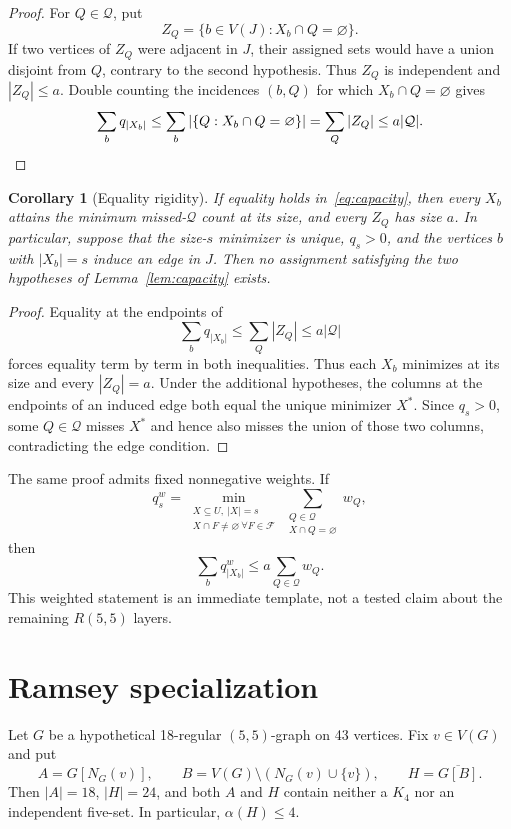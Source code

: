 \documentclass[11pt]{article}
\newtheorem{corollary}[theorem]{Corollary}
\newcommand{\Q}{\mathcal Q}
\newcommand{\F}{\mathcal F}
\begin{document}
\begin{proof}
For $Q\in\Q$, put
\[
 Z_Q=\{b\in V(J):X_b\cap Q=\varnothing\}.
\]
If two vertices of $Z_Q$ were adjacent in $J$, their assigned sets would have
a union disjoint from $Q$, contrary to the second hypothesis.  Thus $Z_Q$ is
independent and $|Z_Q|\leq a$.  Double counting the incidences $(b,Q)$ for
which $X_b\cap Q=\varnothing$ gives
\[
 \sum_bq_{|X_b|}
 \leq\sum_b|\{Q:X_b\cap Q=\varnothing\}|
 =\sum_Q|Z_Q|
 \leq a|\Q|.\qedhere
\]
\end{proof}

\begin{corollary}[Equality rigidity]\label{cor:rigidity}
If equality holds in~\eqref{eq:capacity}, then every $X_b$ attains the
minimum missed-$\Q$ count at its size, and every $Z_Q$ has size $a$.  In
particular, suppose that the size-$s$ minimizer is unique, $q_s>0$, and the
vertices $b$ with $|X_b|=s$ induce an edge in $J$.  Then no assignment
satisfying the two hypotheses of Lemma~\ref{lem:capacity} exists.
\end{corollary}

\begin{proof}
Equality at the endpoints of
\[
 \sum_bq_{|X_b|}
 \leq \sum_Q|Z_Q|
 \leq a|\Q|
\]
forces equality term by term in both inequalities.  Thus each $X_b$
minimizes at its size and every $|Z_Q|=a$.  Under the additional hypotheses,
the columns at the endpoints of an induced edge both equal the unique
minimizer $X^\ast$.  Since $q_s>0$, some $Q\in\Q$ misses $X^\ast$ and hence
also misses the union of those two columns, contradicting the edge
condition.
\end{proof}

The same proof admits fixed nonnegative weights.  If
\[
 q_s^w=
 \min_{\substack{X\subseteq U,\ |X|=s\\
                  X\cap F\ne\varnothing\ \forall F\in\F}}
 \sum_{\substack{Q\in\Q\\X\cap Q=\varnothing}}w_Q,
\]
then
\[
 \sum_bq_{|X_b|}^w\leq a\sum_{Q\in\Q}w_Q.
\]
This weighted statement is an immediate template, not a tested claim about
the remaining $R(5,5)$ layers.

\section{Ramsey specialization}

Let $G$ be a hypothetical 18-regular $(5,5)$-graph on 43 vertices.  Fix
$v\in V(G)$ and put
\[
 A=G[N_G(v)],\qquad
 B=V(G)\setminus(N_G(v)\cup\{v\}),\qquad
 H=\overline{G[B]}.
\]
Then $|A|=18$, $|H|=24$, and both $A$ and $H$ contain neither a $K_4$ nor an
independent five-set.  In particular, $\alpha(H)\leq4$.
\end{document}
